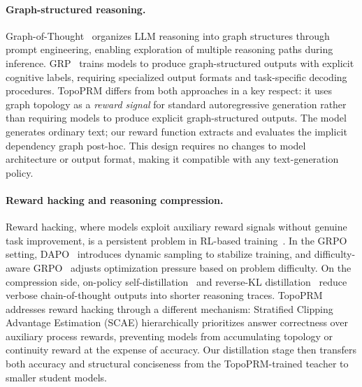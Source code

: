 \paragraph{Graph-structured reasoning.}
Graph-of-Thought~\citep{besta2024graph} organizes LLM reasoning into
graph structures through prompt engineering, enabling exploration of
multiple reasoning paths during inference.
GRP~\citep{grp2025} trains models to produce graph-structured outputs
with explicit cognitive labels, requiring specialized output formats and
task-specific decoding procedures. TopoPRM differs from both approaches
in a key respect: it uses graph topology as a \emph{reward signal} for
standard autoregressive generation rather than requiring models to
produce explicit graph-structured outputs. The model generates ordinary
text; our reward function extracts and evaluates the implicit dependency
graph post-hoc. This design requires no changes to model architecture or
output format, making it compatible with any text-generation policy.

\paragraph{Reward hacking and reasoning compression.}
Reward hacking, where models exploit auxiliary reward signals without
genuine task improvement, is a persistent problem in RL-based
training~\citep{Denison2024SycophancyTS}. In the GRPO setting,
DAPO~\citep{dapo2026} introduces dynamic sampling to stabilize training,
and difficulty-aware GRPO~\citep{difficultyGRPO2026} adjusts
optimization pressure based on problem difficulty. On the compression
side, on-policy self-distillation~\citep{reasoning_compression_2025} and
reverse-KL distillation~\citep{hinton2015distilling} reduce verbose
chain-of-thought outputs into shorter reasoning traces. TopoPRM
addresses reward hacking through a different mechanism: Stratified
Clipping Advantage Estimation (SCAE) hierarchically prioritizes answer
correctness over auxiliary process rewards, preventing models from
accumulating topology or continuity reward at the expense of accuracy.
Our distillation stage then transfers both accuracy and structural
conciseness from the TopoPRM-trained teacher to smaller student models.
